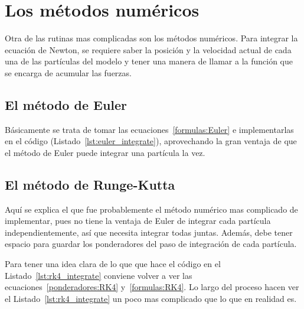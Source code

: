 \section{Los métodos numéricos}
Otra de las rutinas mas complicadas son los métodos numéricos.
Para integrar la ecuación de Newton, se requiere saber la posición y la velocidad actual de cada una de las partículas del modelo y tener una manera de llamar a la función que se encarga de acumular las fuerzas.

\subsection{El método de Euler}
Básicamente se trata de tomar las ecuaciones~\ref{formulas:Euler} e implementarlas en el código (Listado~\ref{lst:euler_integrate}), aprovechando la gran ventaja de que el método de Euler puede integrar una partícula la vez.


\subsection{El método de Runge-Kutta}
Aquí se explica el que fue probablemente el método numérico mas complicado de implementar, pues no tiene la ventaja de Euler de integrar cada partícula independientemente, así que necesita integrar todas juntas.
Además, debe tener espacio para guardar los ponderadores del paso de integración de cada partícula.

Para tener una idea clara de lo que que hace el código en el Listado~\ref{lst:rk4_integrate} conviene volver a ver las ecuaciones~\ref{ponderadores:RK4} y~\ref{formulas:RK4}.
Lo largo del proceso hacen ver el Listado~\ref{lst:rk4_integrate} un poco mas complicado que lo que en realidad es.


